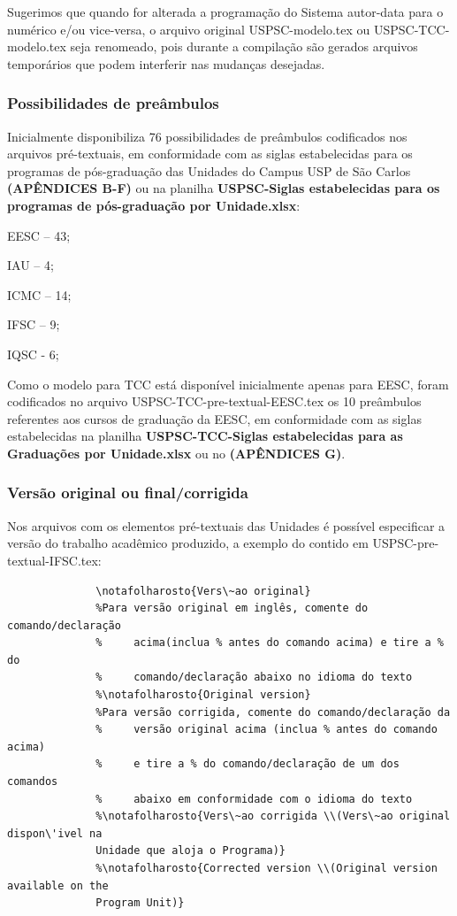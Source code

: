 Sugerimos que quando for alterada a programação do Sistema autor-data para o numérico e/ou vice-versa, o arquivo original USPSC-modelo.tex ou USPSC-TCC-modelo.tex seja renomeado, pois durante a compilação são gerados arquivos temporários que podem interferir nas mudanças desejadas.			 

\subsubsection{Possibilidades de preâmbulos}

Inicialmente disponibiliza 76 possibilidades de preâmbulos codificados nos arquivos pré-textuais, em conformidade com as siglas estabelecidas para os programas de pós-graduação das Unidades do Campus USP de São Carlos \textbf{(APÊNDICES B-F)} ou na planilha \textbf{USPSC-Siglas estabelecidas para os programas de pós-graduação por Unidade.xlsx}:
	
				  
			   \begin{alineas}
			   	\item EESC – 43;
				\item IAU – 4;
				\item  ICMC – 14;
				\item  IFSC – 9;
				\item  IQSC - 6;
			  \end{alineas}	
			  
Como o modelo para TCC está disponível inicialmente apenas para EESC, foram codificados no arquivo USPSC-TCC-pre-textual-EESC.tex os 10 preâmbulos referentes aos cursos de graduação da EESC, em conformidade com as siglas estabelecidas na planilha \textbf{USPSC-TCC-Siglas estabelecidas para as Graduações por Unidade.xlsx} ou no \textbf{(APÊNDICES G)}.
	  						
\subsubsection{Versão original ou final/corrigida}
Nos arquivos com os elementos pré-textuais das Unidades é possível especificar a versão do trabalho acadêmico produzido, a exemplo do contido em USPSC-pre-textual-IFSC.tex:	  
			  \begin{verbatim}
			  \notafolharosto{Vers\~ao original}
			  %Para versão original em inglês, comente do comando/declaração 
			  %     acima(inclua % antes do comando acima) e tire a % do 
			  %     comando/declaração abaixo no idioma do texto
			  %\notafolharosto{Original version} 
			  %Para versão corrigida, comente do comando/declaração da 
			  %     versão original acima (inclua % antes do comando acima) 
			  %     e tire a % do comando/declaração de um dos comandos 
			  %     abaixo em conformidade com o idioma do texto
			  %\notafolharosto{Vers\~ao corrigida \\(Vers\~ao original dispon\'ivel na
			  Unidade que aloja o Programa)}
			  %\notafolharosto{Corrected version \\(Original version available on the
			  Program Unit)}
			  \end{verbatim}
			  
